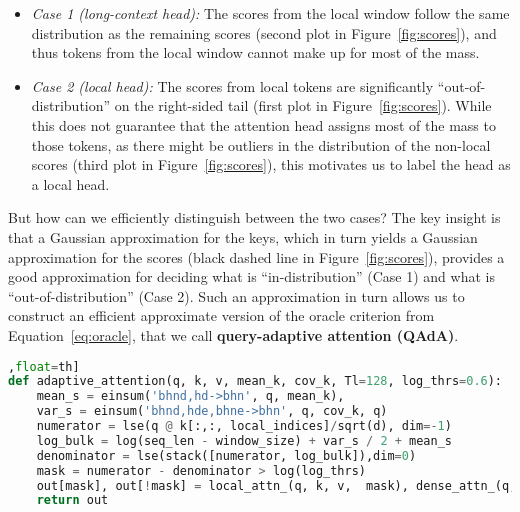 \begin{itemize}
    \item \textit{Case 1 (long-context head):} The scores from the local window follow the same distribution as the remaining scores (second plot in Figure~\ref{fig:scores}), and thus tokens from the local window cannot make up for most of the mass. 
    
    \item \textit{Case 2 (local head):} The scores from local tokens are significantly ``out-of-distribution'' on the right-sided tail (first plot in Figure~\ref{fig:scores}). While this does not guarantee that the attention head assigns most of the mass to those tokens, as there might be outliers in the distribution of the non-local scores (third plot in Figure~\ref{fig:scores}),
    this motivates us to label the head as a local head.
\end{itemize}


But how can we efficiently distinguish between the two cases? The key insight is that a Gaussian approximation for the keys, which in turn yields a  Gaussian approximation for the scores (black dashed line in Figure~\ref{fig:scores}), provides a good approximation for deciding what is ``in-distribution'' (Case 1) and what is ``out-of-distribution'' (Case 2). Such an approximation in turn allows us to construct an efficient approximate version of the oracle criterion from Equation~\eqref{eq:oracle}, that we call \textbf{query-adaptive attention (QAdA)}.




\begin{figure*}[t]
\begin{lstlisting}[language=Python, caption=Query-adaptive attention (QAdA) with local window approximation, label={lst:adaptive_attention}],float=th]
def adaptive_attention(q, k, v, mean_k, cov_k, Tl=128, log_thrs=0.6):
    mean_s = einsum('bhnd,hd->bhn', q, mean_k), 
    var_s = einsum('bhnd,hde,bhne->bhn', q, cov_k, q)
    numerator = lse(q @ k[:,:, local_indices]/sqrt(d), dim=-1)
    log_bulk = log(seq_len - window_size) + var_s / 2 + mean_s
    denominator = lse(stack([numerator, log_bulk]),dim=0)
    mask = numerator - denominator > log(log_thrs)
    out[mask], out[!mask] = local_attn_(q, k, v,  mask), dense_attn_(q, k, v,  !mask)
    return out
\end{lstlisting}
\end{figure*}


